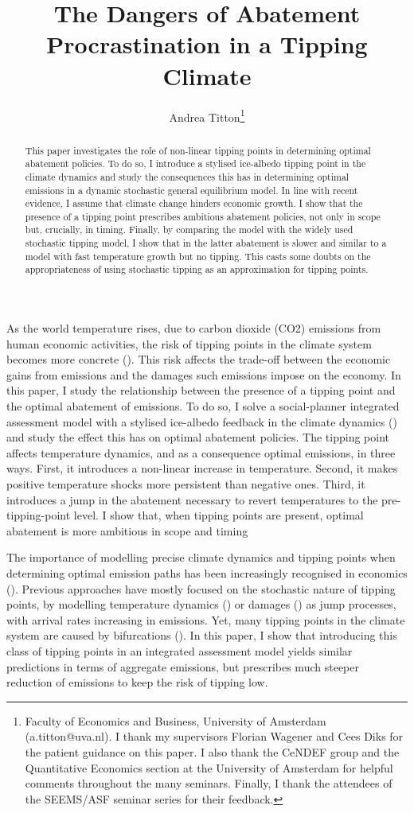 \documentclass[american, abstract=off]{scrartcl}
\author{Andrea Titton\thanks{
      Faculty of Economics and Business, University of Amsterdam (a.titton@uva.nl). I thank my supervisors Florian Wagener and Cees Diks for the patient guidance on this paper. I also thank the CeNDEF group and the Quantitative Economics section at the University of Amsterdam for helpful comments throughout the many seminars. Finally, I thank the attendees of the SEEMS/ASF seminar series for their feedback.
    }}
\title{The Dangers of Abatement Procrastination in a Tipping Climate}
\begin{document}
\maketitle

\begin{abstract}
  This paper investigates the role of non-linear tipping points in determining optimal abatement policies. To do so, I introduce a stylised ice-albedo tipping point in the climate dynamics and study the consequences this has in determining optimal emissions in a dynamic stochastic general equilibrium model. In line with recent evidence, I assume that climate change hinders economic growth. I show that the presence of a tipping point prescribes ambitious abatement policies, not only in scope but, crucially, in timing. 
  Finally, by comparing the model with the widely used stochastic tipping model, I show that in the latter abatement is slower and similar to a model with fast temperature growth but no tipping. This casts some doubts on the appropriateness of using stochastic tipping as an approximation for tipping points.
\end{abstract}

\newpage
As the world temperature rises, due to carbon dioxide (CO2) emissions from human economic activities, the risk of tipping points in the climate system becomes more concrete (\cite{ashwin_extreme_2020,sledd_cloudier_2021}). This risk affects the trade-off between the economic gains from emissions and the damages such emissions impose on the economy. In this paper, I study the relationship between the presence of a tipping point and the optimal abatement of emissions. To do so, I solve a social-planner integrated assessment model with a stylised ice-albedo feedback in the climate dynamics (\cite{hogg_glacial_2008,ashwin_tipping_2012}) and study the effect this has on optimal abatement policies. The tipping point affects temperature dynamics, and as a consequence optimal emissions, in three ways. First, it introduces a non-linear increase in temperature. Second, it makes positive temperature shocks more persistent than negative ones. Third, it introduces a jump in the abatement necessary to revert temperatures to the pre-tipping-point level. I show that, when tipping points are present, optimal abatement is more ambitious in scope and timing

The importance of modelling precise climate dynamics and tipping points when determining optimal emission paths has been increasingly recognised in economics (\cite{van_den_bremer_risk-adjusted_2021,dietz_economic_2021,dietz_are_2020,taconet_social_2021,lontzek_stochastic_2015}). Previous approaches have mostly focused on the stochastic nature of tipping points, by modelling temperature dynamics (\cite{dietz_economic_2021}) or damages (\cite{lontzek_stochastic_2015}) as jump processes, with arrival rates increasing in emissions. Yet, many tipping points in the climate system are caused by bifurcations (\cite{ashwin_extreme_2020,ashwin_tipping_2012}). In this paper, I show that introducing this class of tipping points in an integrated assessment model yields similar predictions in terms of aggregate emissions, but prescribes much steeper reduction of emissions to keep the risk of tipping low.
\end{document}
